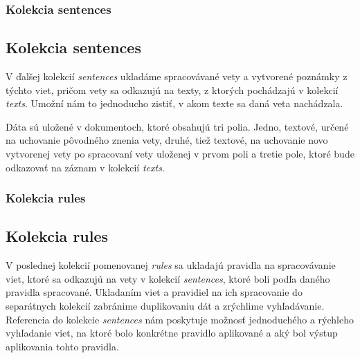 %
%
{
	\subsubsection{Kolekcia sentences}
}
{
	\subsection{Kolekcia sentences}
}
V ďalšej kolekcií \textit{sentences} ukladáme spracovávané vety a vytvorené poznámky z týchto viet, pričom vety sa odkazujú na texty, z ktorých pochádzajú v kolekcií \textit{texts}. Umožní nám to jednoducho zistiť, v akom texte sa daná veta nachádzala.

Dáta sú uložené v dokumentoch, ktoré obsahujú tri polia. Jedno, textové, určené na uchovanie pôvodného znenia vety, druhé, tiež textové, na uchovanie novo vytvorenej vety po spracovaní vety uloženej v prvom poli a tretie pole, ktoré bude odkazovať na záznam v kolekcií \textit{texts}.

%
%
{
	\subsubsection{Kolekcia rules}
}
{
	\subsection{Kolekcia rules}
}
V poslednej kolekcií pomenovanej \textit{rules} sa ukladajú pravidla na spracovávanie viet, ktoré sa odkazujú na vety v kolekcií \textit{sentences}, ktoré boli podľa daného pravidla spracované. Ukladaním viet a pravidiel na ich spracovanie do separátnych kolekcií zabránime duplikovaniu dát a zrýchlime vyhľadávanie. Referencia do kolekcie \textit{sentences} nám poskytuje možnosť jednoduchého a rýchleho vyhľadanie viet, na ktoré bolo konkrétne pravidlo aplikované a aký bol výstup aplikovania tohto pravidla.

